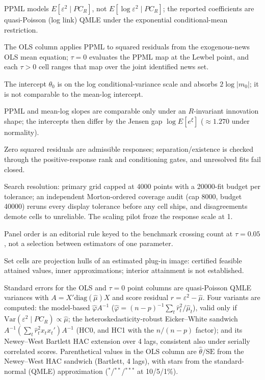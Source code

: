 \documentclass[11pt]{article}
\begin{document}
\begin{table}[!htbp]
\begin{threeparttable}
\begin{tablenotes}[flushleft]
\item PPML models $E[\varepsilon^2 \mid PC_R]$, not $E[\log \varepsilon^2 \mid PC_R]$; the reported coefficients are quasi-Poisson (log link) QMLE under the exponential conditional-mean restriction.
\item The OLS column applies PPML to squared residuals from the exogenous-news OLS mean equation; $\tau{=}0$ evaluates the PPML map at the Lewbel point, and each $\tau{>}0$ cell ranges that map over the joint identified news set.
\item The intercept $\theta_0$ is on the log conditional-variance scale and absorbs $2\log|m_0|$; it is not comparable to the mean-log intercept.
\item PPML and mean-log slopes are comparable only under an $R$-invariant innovation shape; the intercepts then differ by the Jensen gap $\log E[e^{\xi}]$ ($\approx 1.270$ under normality).
\item Zero squared residuals are admissible responses; separation/existence is checked through the positive-response rank and conditioning gates, and unresolved fits fail closed.
\item Search resolution: primary grid capped at 4000 points with a 20000-fit budget per tolerance; an independent Morton-ordered coverage audit (cap 8000, budget 40000) reruns every display tolerance before any cell ships, and disagreements demote cells to unreliable. The scaling pilot froze the response scale at 1.
\item Panel order is an editorial rule keyed to the benchmark crossing count at $\tau{=}0.05$, not a selection between estimators of one parameter.
\item Set cells are projection hulls of an estimated plug-in image: certified feasible attained values, inner approximations; interior attainment is not established.
\item Standard errors for the OLS and $\tau{=}0$ point columns are quasi-Poisson QMLE variances with $A = X'\mathrm{diag}(\hat\mu)X$ and score residual $\hat r = \varepsilon^2 - \hat\mu$. Four variants are computed: the model-based $\hat\varphi A^{-1}$ ($\hat\varphi = (n{-}p)^{-1}\sum_t \hat r_t^2/\hat\mu_t$), valid only if $\mathrm{Var}(\varepsilon^2 \mid PC_R) \propto \hat\mu$; the heteroskedasticity-robust Eicker--White sandwich $A^{-1}(\sum_t \hat r_t^2 x_t x_t')A^{-1}$ (HC0, and HC1 with the $n/(n{-}p)$ factor); and its Newey--West Bartlett HAC extension over 4 lags, consistent also under serially correlated scores. Parenthetical values in the OLS column are $\hat\theta/\mathrm{SE}$ from the Newey--West HAC sandwich (Bartlett, 4 lags), with stars from the standard-normal (QMLE) approximation ($^{*}$/$^{**}$/$^{***}$ at 10/5/1\%).

\end{tablenotes}
\end{threeparttable}
\end{table}
\end{document}
